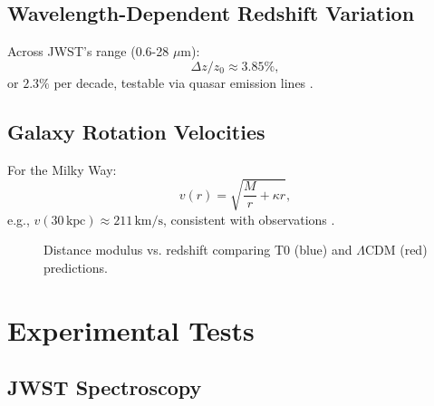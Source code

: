\documentclass[twocolumn,aps,prl]{revtex4-2}
\newcommand{\LCDM}{\Lambda\text{CDM}}
\begin{document}
	\subsection{Wavelength-Dependent Redshift Variation}
	\label{subsec:wavelength_redshift_prediction}
	
	Across JWST’s range (0.6-28 \(\mu\text{m}\)):
	\begin{equation}
		\Delta z / z_0 \approx 3.85\%,
		\label{eq:wavelength_variation}
	\end{equation}
	or \(2.3\%\) per decade, testable via quasar emission lines \cite{pascher_params_2025}.
	
	\subsection{Galaxy Rotation Velocities}
	\label{subsec:rotation_velocity_prediction}
	
	For the Milky Way:
	\begin{equation}
		v(r) = \sqrt{\frac{M}{r} + \kappa r},
		\label{eq:rotation_velocity_repeat}
	\end{equation}
	e.g., \(v(30 \, \text{kpc}) \approx 211 \, \text{km/s}\), consistent with observations \cite{McGaugh2016}.
	
	\begin{figure}[ht]
		\centering
		\caption{Distance modulus vs. redshift comparing T0 (blue) and \(\LCDM\) (red) predictions.}
		\label{fig:distance_modulus}
	\end{figure}
	
	\section{Experimental Tests}
	\label{sec:tests}
	
	\subsection{JWST Spectroscopy}
	\label{subsec:jwst_test}
	
\end{document}
